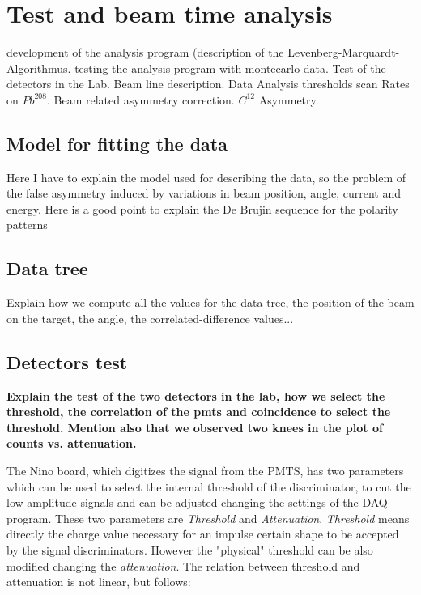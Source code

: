 \chapter{Test and beam time analysis} \label{analysis}

\begin{outline}[enumerate]
\1 development of the analysis program (description of the Levenberg-Marquardt-Algorithmus.
\1 testing the analysis program with montecarlo data.
\1 Test of the detectors in the Lab.
\1 Beam line description.
\1 Data Analysis
	\2 thresholds scan
	\2 Rates on $Pb^{208}$.
	\2 Beam related asymmetry correction.
	\2 $C^{12}$ Asymmetry.
\end{outline}

\section{Model for fitting the data}
Here I have to explain the model used for describing the data, so the problem of the false asymmetry induced by variations in beam position, angle, current and energy. Here is a good point to explain the De Brujin sequence for the polarity patterns

\section{Data tree}
Explain how we compute all the values for the data tree, the position of the beam on the target, the angle, the correlated-difference values...

\section{Detectors test}

{\bfseries Explain the test of the two detectors in the lab, how we select the threshold, the correlation of the pmts and coincidence to select the threshold. Mention also that we observed two knees in the plot of counts vs. attenuation.}

The Nino board, which digitizes the signal from the PMTS, has two parameters which can be used to select the internal threshold of the discriminator, to cut the low amplitude signals and can be adjusted changing the settings of the DAQ program. These two parameters are \textit{Threshold} and \textit{Attenuation}. \textit{Threshold} means directly the charge value necessary for an impulse certain shape to be accepted by the signal discriminators. However the "physical" threshold can be also modified changing the \textit{attenuation}. The relation between threshold and attenuation is not linear, but follows:

